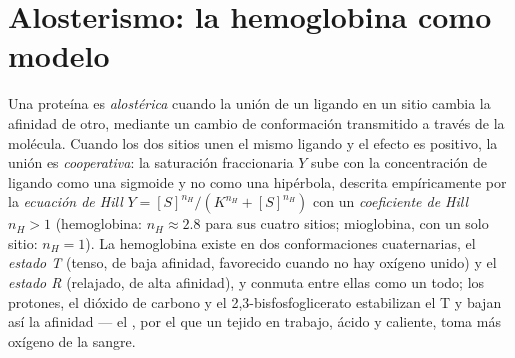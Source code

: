 \section{Alosterismo: la hemoglobina como modelo}

\begin{definition}\label{def:b3:structural-biology:allostery}
Una proteína es \emph{alostérica} cuando la unión de un ligando en un
sitio cambia la afinidad de otro, mediante un cambio de conformación
transmitido a través de la molécula. Cuando los dos sitios unen el mismo
ligando y el efecto es positivo, la unión es \emph{cooperativa}: la
saturación fraccionaria $Y$ sube con la concentración de ligando como una
sigmoide y no como una hipérbola, descrita empíricamente por la
\emph{ecuación de Hill} $Y = [S]^{n_{H}}/(K^{n_{H}} +
[S]^{n_{H}})$ con un \emph{coeficiente de Hill} $n_{H} > 1$ (hemoglobina:
$n_{H} \approx 2.8$ para sus cuatro sitios; mioglobina, con un solo
sitio: $n_{H} =
1$). La hemoglobina existe en dos conformaciones cuaternarias, el
\emph{estado T} (tenso, de baja afinidad, favorecido cuando no hay
oxígeno unido) y el \emph{estado R} (relajado, de alta afinidad), y
conmuta entre ellas como un todo; los protones, el dióxido de carbono y
el 2,3-bisfosfoglicerato estabilizan el T y bajan así la afinidad --- el
, por el que un tejido en trabajo, ácido y caliente, toma más
oxígeno de la sangre.
\end{definition}

